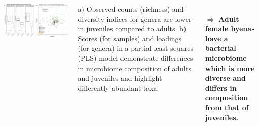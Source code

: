 \documentclass[30pt, a0paper, portrait, margin=0mm, innermargin=15mm,
               blockverticalspace=15mm, colspace=15mm, subcolspace=8mm]{tikzposter}
\begin{document}
\begin{columns}
 {

        \begin{minipage}{0.7\linewidth}                  
          \begin{left}
              \includegraphics[scale=0.9]{Figure3_man.png} 
          \end{left}
        \end{minipage}
        \hfill
        \begin{minipage}{0.3\linewidth}
          a) Observed counts (richness) and diversity indices for
          genera are lower in juveniles compared to adults. b) Scores
          (for samples) and loadings (for genera) in a partial least
          squares (PLS) model demonstrate differences in microbiome
          composition of adults and juveniles and highlight
          differently abundant taxa.\\
        \end{minipage}

        \\ $\Rightarrow$ \textbf{Adult female hyenas have a bacterial
          microbiome which is more diverse and differs in composition
          from that of juveniles.}  }


\end{columns}
\end{document}
